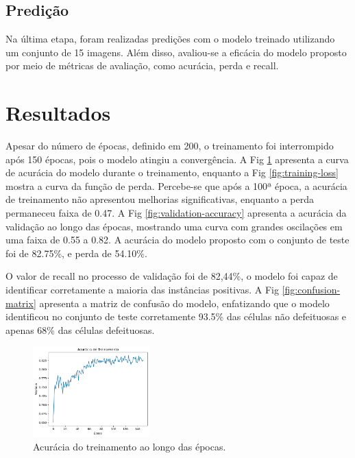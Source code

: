\documentclass[conference]{IEEEtran}
\begin{document}
\subsection{Predição}\label{AA}

Na última etapa, foram realizadas predições com o modelo treinado utilizando
um conjunto de 15 imagens. Além disso, avaliou-se a eficácia do modelo proposto
por meio de métricas de avaliação, como acurácia, perda e recall.

\section{Resultados}

Apesar do número de épocas, definido em 200, o treinamento foi interrompido
após 150 épocas, pois o modelo atingiu a convergência. A Fig
\ref{fig:training-accuracy} apresenta a curva de acurácia
do modelo durante o treinamento, enquanto a Fig \ref{fig:training-loss}
mostra a curva da função de perda. Percebe-se que após a 100ª época, a acurácia
de treinamento não apresentou melhorias significativas, enquanto a perda
permaneceu faixa de 0.47. A Fig \ref{fig:validation-accuracy} apresenta a
acurácia da validação ao longo das épocas, mostrando uma curva com grandes
oscilações em uma faixa de 0.55 a 0.82. A acurácia do modelo proposto com o
conjunto de teste foi de 82.75\%, e perda de 54.10\%.

O valor de recall no processo de validação foi de 82,44\%, o modelo foi capaz
de identificar corretamente a maioria das instâncias positivas. A Fig
\ref{fig:confusion-matrix} apresenta a matriz de confusão do modelo,
enfatizando que o modelo identificou no conjunto de teste corretamente 93.5\%
das células não defeituosas e apenas 68\% das células defeituosas.

\begin{figure}[htbp]

    \centerline{\includegraphics[width=0.4\textwidth]{images/training-accuracy.png}}
    \caption{Acurácia do treinamento ao longo das épocas.}
    \label{fig:training-accuracy}
\end{figure}
\end{document}
